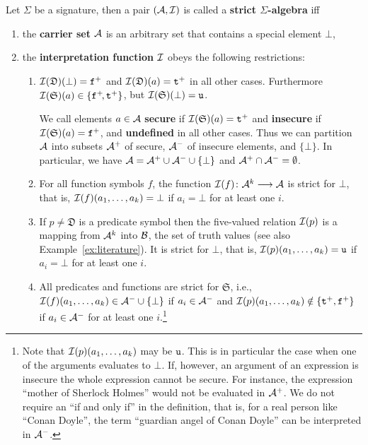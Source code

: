 \documentclass{\filespath jancl}
\def\Signat{{\Sigma}}                 %
\def\to{\longrightarrow}
\def\cA{{\cal A}}\def\cB{{\cal B}}\def\cC{{\cal C}}
\newcommand{\Defined}{{\mathfrak D}}
\newcommand{\Secure}{{\mathfrak S}}
\newcommand{\undefined}{{\sf u}}
\newcommand{\twts}{{{\sf t}^+}}
\newcommand{\twfs}{{{\sf f}^+}}
\def\sf{\tt}
\begin{document}
\begin{definition}
  Let $\Signat$ be a signature, then a pair $(\cA,\cI)$ is called a {\bf strict
    $\Sigma$-algebra} iff\vspace{-1.5ex}
   \begin{enumerate}
     \item the {\bf carrier set} $\cA$ is an arbitrary set that contains a
       special element $\bot$,
     \item\label{alg:int} the {\bf interpretation function ${\cal I}$} obeys the following
       restrictions: 
        \begin{enumerate}
           \item $\cI(\Defined)(\bot)=\twfs$ and  $\cI(\Defined)(a)=\twts$
             in all other cases. Furthermore $\cI(\Secure)(a)\in\{\twfs\!,\twts\}$, but
             $\cI(\Secure)(\bot)=\undefined$. 
             
             We call elements $a\in\cA$ {\bf secure} if $\cI(\Secure)(a)=\twts$
             and {\bf insecure} if $\cI(\Secure)(a)=\twfs$, and {\bf
             undefined} in all other cases. Thus we can partition $\cA$ into subsets $\cA^+$ of
             secure, $\cA^-$ of insecure elements, and $\{\bot\}$. In
             particular, we have
             $\cA=\cA^+\cup\cA^-\cup\{\bot\}$ and $\cA^+\cap\cA^-=\emptyset$.

           \item For all function symbols $f$, the function
             $\cI(f)\colon\cA^k\to\cA$ is strict for $\bot$, that is,
             ${\cal I}(f)(a_1,\ldots,a_k)=\bot$ if $a_i=\bot$ for at least one
             $i$.
           \item If $p\ne\Defined$ is a predicate symbol then the five-valued
             relation ${\cal I}(p)$ is a mapping from $\cA^k$ into $\cB$, the set of
             truth values (see also Example~\ref{ex:literature}).  It is strict for
             $\bot$, that is, $\cI(p)(a_1,\ldots,a_k)=\undefined$ if $a_i=\bot$
             for at least one $i$.
           \item\label{alg:strict} All predicates and functions are strict for $\Secure$,
             i.e., $\cI(f)(a_1,\ldots,a_k)\in\cA^-\cup\{\bot\}$ if $a_{i}\in\cA^{-}$ and 
              $\cI(p)(a_1,\ldots,a_k)\notin\{\twts,\twfs\}$ if
             $a_{i}\in\cA^{-}$ for at least one $i$.\footnote{Note that
             ${\cal I}(p)(a_1,\ldots,a_k)$ may be $\undefined$.  This is in particular
             the case when one of the arguments evaluates to $\bot$.
             If, however, an argument of an expression is insecure the whole
             expression cannot be secure.  For instance, the expression ``mother of
             Sherlock Holmes'' would not be evaluated in $\cA^+$. We do not
             require an ``if and only if'' in the definition, that
             is, for a real person like ``Conan Doyle'', the
             term ``guardian angel of Conan Doyle'' can be
             interpreted in $\cA^-$.}
        \end{enumerate}
  \end{enumerate}
\end{definition}
  
\end{document}

